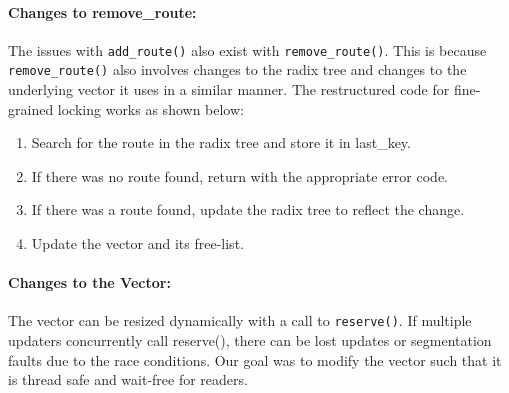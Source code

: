 \documentclass[12pt,a4paper]{article}
\begin{document}
\paragraph{Changes to remove\_route:}
The issues with \verb+add_route()+ also exist with \verb+remove_route()+. This is because \verb+remove_route()+ also involves changes to the radix tree and changes to the underlying vector it uses in a similar manner. The restructured code for fine-grained locking works as shown below:
\begin{enumerate}
\item Search for the route in the radix tree and store it in last\_key.
\item If there was no route found, return with the appropriate error code.
\item If there was a route found, update the radix tree to reflect the change. 
\item Update the vector and its free-list.
\end{enumerate}
\paragraph{Changes to the Vector:}
The vector can be resized dynamically with a call to \verb+reserve()+. If multiple updaters concurrently call reserve(), there can be lost updates or segmentation faults due to the race conditions. Our goal was to modify the vector such that it is thread safe and wait-free for readers.\\
\end{document}
